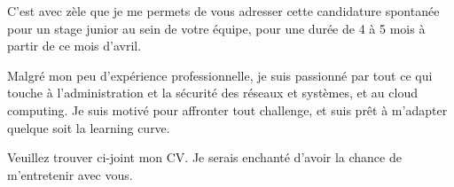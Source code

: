 \documentclass[11pt, a4paper]{awesome-cv} %
\begin{document}
\makecvheader %

\makelettertitle %


\begin{cvletter}

C'est avec zèle que je me permets de vous adresser cette candidature spontanée pour un stage junior au sein de votre équipe, pour une durée de 4 à 5 mois à partir de ce mois d'avril.

Malgré mon peu d'expérience professionnelle, je suis passionné par tout ce qui touche à l'administration et la sécurité des réseaux et systèmes, et au cloud computing. Je suis motivé pour affronter tout challenge, et suis prêt à m'adapter quelque soit la learning curve.

Veuillez trouver ci-joint mon CV. Je serais enchanté d'avoir la chance de m'entretenir avec vous.


\end{cvletter}


\makeletterclosing %
\end{document}
